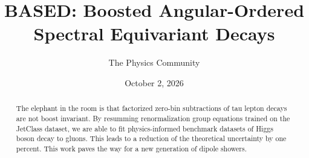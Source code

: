 \documentclass[11pt]{article}
\title{BASED: Boosted Angular-Ordered Spectral Equivariant Decays}
\author{The Physics Community}
\date{October 2, 2026}
\begin{document}
\maketitle
\begin{abstract}
The elephant in the room is that factorized zero-bin subtractions of tau
lepton decays are not boost invariant. By resumming renormalization
group equations trained on the JetClass dataset, we are able to fit
physics-informed benchmark datasets of Higgs boson decay to gluons. This
leads to a reduction of the theoretical uncertainty by one percent. This
work paves the way for a new generation of dipole showers.
\end{abstract}
\tableofcontents






\nocite{*}


\end{document}
